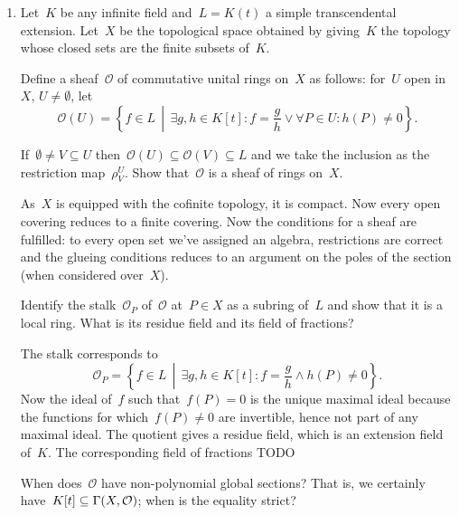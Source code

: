 \documentclass[a4paper,11pt,oneside,openany,article]{memoir}
\begin{document}
\begin{enumerate}
  \item Let~$K$ be any infinite field and~$L=K(t)$ a simple transcendental extension. Let~$X$ be the topological space obtained by giving~$K$ the topology whose closed sets are the finite subsets of~$K$.

    Define a sheaf~$\mathcal{O}$ of commutative unital rings on~$X$ as follows: for~$U$ open in~$X$, $U\neq\emptyset$, let
    \begin{equation}
      \mathcal{O}(U)=\left\{ f\in L\,\middle|\,\exists g,h\in K[t]\colon f=\frac{g}{h}\vee\forall P\in U\colon h(P)\neq 0 \right\}.
      \label{equation:rational-functions}
    \end{equation}

    If~$\emptyset\neq V\subseteq U$ then~$\mathcal{O}(U)\subseteq\mathcal{O}(V)\subseteq L$ and we take the inclusion as the restriction map~$\rho_V^U$. Show that~$\mathcal{O}$ is a sheaf of rings on~$X$.

    \begin{solution}
      As~$X$ is equipped with the cofinite topology, it is compact. Now every open covering reduces to a finite covering. Now the conditions for a sheaf are fulfilled: to every open set we've assigned an algebra, restrictions are correct and the glueing conditions reduces to an argument on the poles of the section (when considered over~$X$).
    \end{solution}

    Identify the stalk~$\mathcal{O}_P$ of~$\mathcal{O}$ at~$P\in X$ as a subring of~$L$ and show that it is a local ring. What is its residue field and its field of fractions?

    \begin{solution}
      The stalk corresponds to
      \begin{equation}
        \mathcal{O}_P=\left\{ f\in L\,\middle|\,\exists g,h\in K[t]\colon f=\frac{g}{h}\wedge h(P)\neq 0 \right\}.
      \end{equation}
      Now the ideal of~$f$ such that~$f(P)=0$ is the unique maximal ideal because the functions for which~$f(P)\neq 0$ are invertible, hence not part of any maximal ideal. The quotient gives a residue field, which is an extension field of~$K$. The corresponding field of fractions TODO
    \end{solution}

    When does~$\mathcal{O}$ have non-polynomial global sections? That is, we certainly have~$K[t]\subseteq\mathrm{\Gamma}(X,\mathcal{O})$; when is the equality strict?


\end{enumerate}
\end{document}
